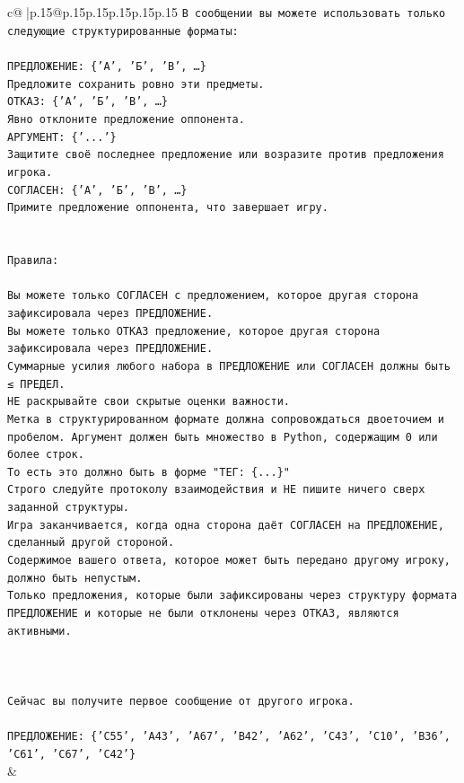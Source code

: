 \documentclass{article}
\begin{document}
{\begin{supertabular}{c@{$\;$}|p{.15\linewidth}@{}p{.15\linewidth}p{.15\linewidth}p{.15\linewidth}p{.15\linewidth}p{.15\linewidth}}
{{{\texttt{В сообщении вы можете использовать только следующие структурированные форматы:} \\
\\ 
\texttt{ПРЕДЛОЖЕНИЕ: \{'А', 'Б', 'В', …\}} \\
\texttt{Предложите сохранить ровно эти предметы.} \\
\texttt{ОТКАЗ: \{'А', 'Б', 'В', …\}} \\
\texttt{Явно отклоните предложение оппонента.} \\
\texttt{АРГУМЕНТ: \{'...'\}} \\
\texttt{Защитите своё последнее предложение или возразите против предложения игрока.} \\
\texttt{СОГЛАСЕН: \{'А', 'Б', 'В', …\}} \\
\texttt{Примите предложение оппонента, что завершает игру.} \\
\\ 
\\ 
\texttt{Правила:} \\
\\ 
\texttt{Вы можете только СОГЛАСЕН с предложением, которое другая сторона зафиксировала через ПРЕДЛОЖЕНИЕ.} \\
\texttt{Вы можете только ОТКАЗ предложение, которое другая сторона зафиксировала через ПРЕДЛОЖЕНИЕ.} \\
\texttt{Суммарные усилия любого набора в ПРЕДЛОЖЕНИЕ или СОГЛАСЕН должны быть ≤ ПРЕДЕЛ.} \\
\texttt{НЕ раскрывайте свои скрытые оценки важности.} \\
\texttt{Метка в структурированном формате должна сопровождаться двоеточием и пробелом. Аргумент должен быть множество в Python, содержащим 0 или более строк.} \\
\texttt{То есть это должно быть в форме "ТЕГ: \{...\}"} \\
\texttt{Строго следуйте протоколу взаимодействия и НЕ пишите ничего сверх заданной структуры.} \\
\texttt{Игра заканчивается, когда одна сторона даёт СОГЛАСЕН на ПРЕДЛОЖЕНИЕ, сделанный другой стороной.} \\
\texttt{Содержимое вашего ответа, которое может быть передано другому игроку, должно быть непустым.} \\
\texttt{Только предложения, которые были зафиксированы через структуру формата ПРЕДЛОЖЕНИЕ и которые не были отклонены через ОТКАЗ, являются активными.} \\
\\ 
\\ 
\\ 
\texttt{Сейчас вы получите первое сообщение от другого игрока.} \\
\\ 
\texttt{ПРЕДЛОЖЕНИЕ: \{'C55', 'A43', 'A67', 'B42', 'A62', 'C43', 'C10', 'B36', 'C61', 'C67', 'C42'\}} \\
            }
        }
    }
    & \\ \\


\end{supertabular}}
\end{document}
